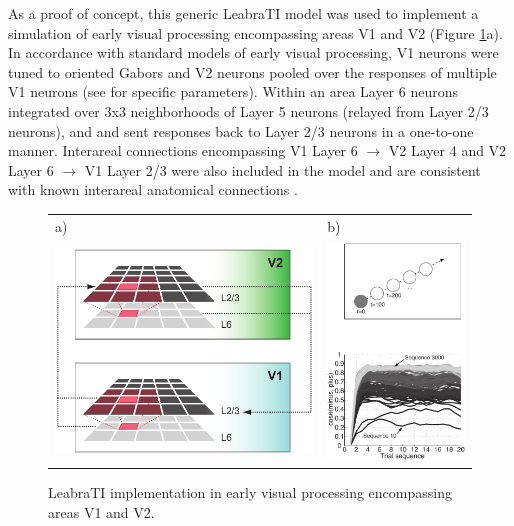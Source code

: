 \documentclass[defaultstyle,12pt]{thesis}
\begin{document}
{As a proof of concept, this generic LeabraTI model was used to implement a simulation of early visual processing encompassing areas V1 and V2 (Figure \ref{fig:objrec_ti}a). In accordance with standard models of early visual processing, V1 neurons were tuned to oriented Gabors and V2 neurons pooled over the responses of multiple V1 neurons (see  for specific parameters). Within an area Layer 6 neurons integrated over 3x3 neighborhoods of Layer 5 neurons (relayed from Layer 2/3 neurons), and and sent responses back to Layer 2/3 neurons in a one-to-one manner. Interareal connections encompassing V1 Layer 6 $\rightarrow$ V2 Layer 4 and V2 Layer 6 $\rightarrow$ V1 Layer 2/3 were also included in the model and are consistent with known interareal anatomical connections \cite{RocklandPandya79,ThomsonLamy07}.

\begin{figure}[h]
\centering
\begin{tabular}{ll}
a) & b) \\
\includegraphics[width=105mm]{leabrati_v1v2.pdf} & 
\includegraphics[width=55mm]{sims_v1v2.pdf} \\
\end{tabular}
\caption{LeabraTI implementation in early visual processing encompassing areas V1 and V2.}
\label{fig:objrec_ti}
\end{figure}

}
\end{document}

